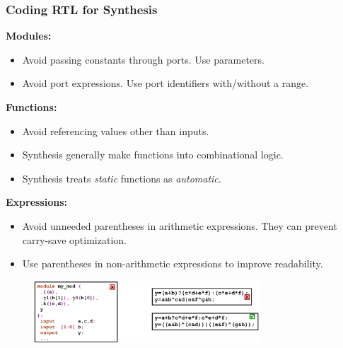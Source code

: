 \documentclass[t, notes, xcolor=table]{beamer}
\begin{document}
\begin{frame}
\frametitle{Coding RTL for Synthesis}
\scriptsize{
\textbf{Modules:}
\begin{itemize}
\item Avoid passing constants through ports. Use parameters.
\item Avoid port expressions. Use port identifiers with/without a range.
\end{itemize}
\textbf{Functions:}
\begin{itemize}
\item Avoid referencing values other than inputs.
\item Synthesis generally make functions into combinational logic.
\item Synthesis treats \textit{static} functions as \textit{automatic}.
\end{itemize}
\textbf{Expressions:}
\begin{itemize}
\item Avoid unneeded parentheses in arithmetic expressions. They can prevent carry-save optimization.
\item Use parentheses in non-arithmetic expressions to improve readability.
\end{itemize}
}
\begin{figure}
    \includegraphics[width=0.75\textwidth]{img/16_rtl_coding.png}
\end{figure}
\end{frame}
\end{document}
